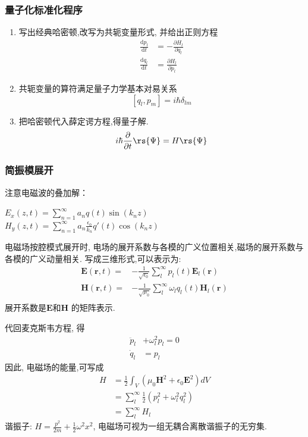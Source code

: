 \begin{frame}
  \frametitle{量子化标准化程序}
  \begin{enumerate}
    \item 写出经典哈密顿,改写为共轭变量形式, 并给出正则方程 
    \[ \begin{aligned}
      \frac{\mathrm{d}p_l}{\mathrm{d}t} &= - \frac{\partial H_l}{\partial q_l}  \\ 
      \frac{\mathrm{d}q_l}{\mathrm{d}t} &= \frac{\partial H_l}{\partial p_l} 
    \end{aligned} 
    \] 
    \item 共轭变量的算符满足量子力学基本对易关系
     \[ [q_l,p_m] =i\hbar \delta_{lm}\]
    \item 把哈密顿代入薛定谔方程,得量子解. 
    \[i\hbar \frac{\partial }{\partial t} \rs{ \Psi}  =H \rs{ \Psi}   \]
  \end{enumerate}
\end{frame}

\begin{frame}
  \frametitle{简振模展开}   
    注意电磁波的叠加解：
    \begin{enumerate}
        \IItem $\displaystyle E_{x}(z,t) = \sum\limits_{n=1}^{\infty } a_n q (t) \sin (k_n z)$
        \IItem $\displaystyle H_{y}(z,t) = \sum\limits_{n=1}^{\infty } a_n \frac{\epsilon_0}{k_n}q' (t) \cos (k_n z)$   
	\end{enumerate}	  
    电磁场按腔模式展开时, 电场的展开系数与各模的广义位置相关,磁场的展开系数与各模的广义动量相关.  写成三维形式,可以表示为:
    \[ \begin{aligned}
        \mathbf{E}( \mathbf{r},t) =& - \frac{1}{\sqrt{ \epsilon_0}} \sum_l ^\infty p_l(t) \mathbf{E}_l( \mathbf{r}) \\
        \mathbf{H}( \mathbf{r},t) =& - \frac{1}{\sqrt{ \mu_0}} \sum_l ^\infty \omega_l q_l(t) \mathbf{H}_l( \mathbf{r}) \\
     \end{aligned} 
    \]
    展开系数是$\mathbf{E}$和$\mathbf{H}$ 的矩阵表示.
\end{frame}

\begin{frame} 
    代回麦克斯韦方程, 得  
    \[ \begin{aligned}
        \ddot{p}_l &+ \omega_l ^2 p_l=0  \\ 
        \dot{q}_l &=p_l
     \end{aligned} 
    \] 
    因此, 电磁场的能量,可写成
    \[ \begin{aligned}
        H &= \frac{1}{2} \int_V (\mu_0 \mathbf{H}^2 + \epsilon_0 \mathbf{E}^2) dV \\ 
        &= \sum_l ^\infty \frac{1}{2}(p_l ^2 + \omega_l ^2 q_l ^2 ) \\ 
        &= \sum_l ^\infty H_l  
     \end{aligned} 
    \] 
    谐振子: $ H = \frac{p^2}{2m} +\frac{1}{2} \omega ^2 x^2 $, 电磁场可视为一组无耦合离散谐振子的无穷集.
\end{frame}

